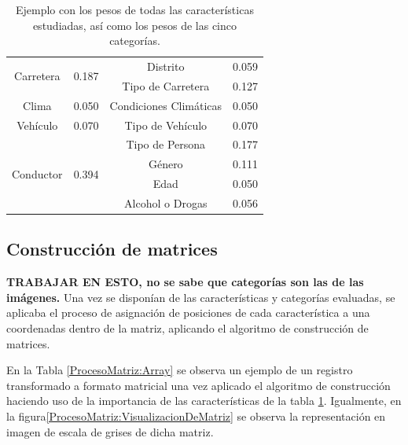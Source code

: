 \documentclass{uathesis-es}
\begin{document}
{\begin{table}[ht]
\begin{tabular}{ |c|c||c|c| }
				\multirow{2}{*}{Carretera} & \multirow{2}{*}{0.187} & Distrito  & 0.059\\      
				&  & Tipo de Carretera & 0.127\\
				\hline
				
				\multirow{1}{*}{Clima}  & \multirow{1}{*}{0.050}  & Condiciones Climáticas  & 0.050\\
				\hline
				
				\multirow{1}{*}{Vehículo}  & \multirow{1}{*}{0.070} & Tipo de Vehículo  & 0.070\\
				\hline
				
				\multirow{4}{*}{Conductor}   & \multirow{4}{*}{0.394} & Tipo de Persona & 0.177\\
				&      & Género      & 0.111\\
				&      & Edad      & 0.050\\
				&      & Alcohol o Drogas  & 0.056\\
				\hline
				
			\end{tabular}
			\caption{Ejemplo con los pesos de todas las características estudiadas, así como los pesos de las cinco categorías.}
			\label{1stPaperWeightsFinalCharacteristics}
		\end{table}
		
		\subsection*{Construcción de matrices}
		
		\textbf{TRABAJAR EN ESTO, no se sabe que categorías son las de las imágenes.}
		Una vez se disponían de las características y categorías evaluadas, se aplicaba el proceso de asignación de posiciones de cada característica a una coordenadas dentro de la matriz, aplicando el algoritmo de construcción de matrices.
		
		En la Tabla \ref{ProcesoMatriz:Array} se observa un ejemplo de un registro transformado a formato matricial una vez aplicado el algoritmo de construcción haciendo uso de la importancia de las características de la tabla \ref{1stPaperWeightsFinalCharacteristics}. Igualmente, en la figura\ref{ProcesoMatriz:VisualizacionDeMatriz} se observa la representación en imagen de escala de grises de dicha matriz.
		
}
\end{document}
